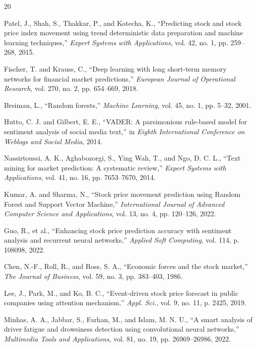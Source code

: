 \documentclass[conference]{IEEEtran}
\begin{document}
\begin{thebibliography}{20}

Patel, J., Shah, S., Thakkar, P., and Kotecha, K., ``Predicting stock and stock price index movement using trend deterministic data preparation and machine learning techniques,'' \textit{Expert Systems with Applications}, vol. 42, no. 1, pp. 259--268, 2015.

Fischer, T. and Krauss, C., ``Deep learning with long short-term memory networks for financial market predictions,'' \textit{European Journal of Operational Research}, vol. 270, no. 2, pp. 654--669, 2018.

Breiman, L., ``Random forests,'' \textit{Machine Learning}, vol. 45, no. 1, pp. 5--32, 2001.

Hutto, C. J. and Gilbert, E. E., ``VADER: A parsimonious rule-based model for sentiment analysis of social media text,'' in \textit{Eighth International Conference on Weblogs and Social Media}, 2014.

Nassirtoussi, A. K., Aghabozorgi, S., Ying Wah, T., and Ngo, D. C. L., ``Text mining for market prediction: A systematic review,'' \textit{Expert Systems with Applications}, vol. 41, no. 16, pp. 7653--7670, 2014.

Kumar, A. and Sharma, N., ``Stock price movement prediction using Random Forest and Support Vector Machine,'' \textit{International Journal of Advanced Computer Science and Applications}, vol. 13, no. 4, pp. 120--126, 2022.

Guo, R., et al., ``Enhancing stock price prediction accuracy with sentiment analysis and recurrent neural networks,'' \textit{Applied Soft Computing}, vol. 114, p. 108098, 2022.

Chen, N.-F., Roll, R., and Ross, S. A., ``Economic forces and the stock market,'' \textit{The Journal of Business}, vol. 59, no. 3, pp. 383--403, 1986.

Lee, J., Park, M., and Ko, B. C., ``Event-driven stock price forecast in public companies using attention mechanism,'' \textit{Appl. Sci.}, vol. 9, no. 11, p. 2425, 2019.

Minhas, A. A., Jabbar, S., Farhan, M., and Islam, M. N. U., ``A smart analysis of driver fatigue and drowsiness detection using convolutional neural networks,'' \textit{Multimedia Tools and Applications}, vol. 81, no. 19, pp. 26969--26986, 2022.


\end{thebibliography}
\end{document}
